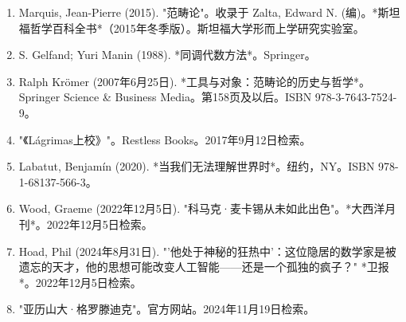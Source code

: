 \begin{enumerate}
\item Marquis, Jean-Pierre (2015). "范畴论"。收录于 Zalta, Edward N. (编)。*斯坦福哲学百科全书*（2015年冬季版）。斯坦福大学形而上学研究实验室。  
\item S. Gelfand; Yuri Manin (1988). *同调代数方法*。Springer。  
\item Ralph Krömer (2007年6月25日). *工具与对象：范畴论的历史与哲学*。Springer Science & Business Media。第158页及以后。ISBN 978-3-7643-7524-9。  
\item "《Lágrimas上校》"。Restless Books。2017年9月12日检索。  
\item Labatut, Benjamín (2020). *当我们无法理解世界时*。纽约，NY。ISBN 978-1-68137-566-3。  
\item Wood, Graeme (2022年12月5日). "科马克·麦卡锡从未如此出色"。*大西洋月刊*。2022年12月5日检索。  
\item Hoad, Phil (2024年8月31日). "'他处于神秘的狂热中'：这位隐居的数学家是被遗忘的天才，他的思想可能改变人工智能——还是一个孤独的疯子？" *卫报*。2022年12月5日检索。  
\item "亚历山大·格罗滕迪克"。官方网站。2024年11月19日检索。
\end{enumerate}
